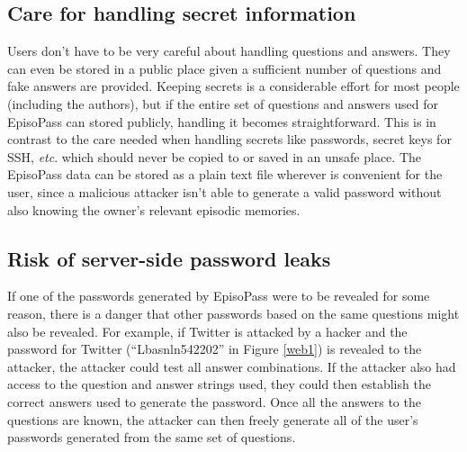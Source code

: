 \documentclass[runningheads,a4paper]{llncs}
\begin{document}
\subsection{Care for handling secret information}

Users don't have to be very careful about handling questions and answers.
They can even be stored in a public place
given a sufficient number of questions and fake answers are provided.
%
Keeping secrets is a considerable effort for most people (including
the authors), but if the entire set of questions and answers used for EpisoPass
can stored publicly,
handling it becomes straightforward.
This is in contrast to the care needed when handling 
secrets like passwords, secret keys for SSH, {\it etc}. which should
never be copied to or saved in an unsafe place.
The EpisoPass data can be stored as a plain text file wherever is convenient
for the user, since a malicious attacker isn't able to generate
a valid password without also knowing the owner's relevant episodic memories.

% 
% 
%

\subsection{Risk of server-side password leaks}

If one of the passwords generated by EpisoPass were to be revealed
for some reason, there is a danger that other passwords based on the same questions
might also be revealed.
%
For example, if Twitter is attacked by a hacker and
the password for Twitter (``\textsf{Lbasnln542202}'' in Figure \ref{web1})
is revealed to the attacker,
the attacker could test all answer combinations. If the attacker also had access
to the question and answer strings used, they could then establish the correct 
answers used to generate the password.
Once all the answers to the questions are known,
the attacker can then freely generate all of the user's passwords
generated from the same set of questions.
\end{document}
